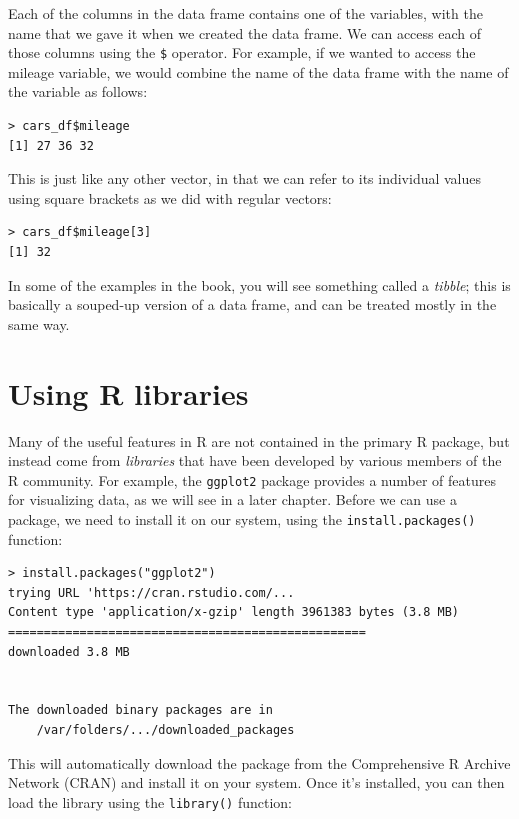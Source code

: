 \documentclass[12pt,]{book}
\begin{document}
Each of the columns in the data frame contains one of the variables, with the name that we gave it when we created the data frame. We can access each of those columns using the \texttt{\$} operator. For example, if we wanted to access the mileage variable, we would combine the name of the data frame with the name of the variable as follows:

\begin{verbatim}
> cars_df$mileage
[1] 27 36 32
\end{verbatim}

This is just like any other vector, in that we can refer to its individual values using square brackets as we did with regular vectors:

\begin{verbatim}
> cars_df$mileage[3]
[1] 32
\end{verbatim}

In some of the examples in the book, you will see something called a \emph{tibble}; this is basically a souped-up version of a data frame, and can be treated mostly in the same way.

\hypertarget{using-r-libraries}{%
\section{Using R libraries}\label{using-r-libraries}}

Many of the useful features in R are not contained in the primary R package, but instead come from \emph{libraries} that have been developed by various members of the R community. For example, the \texttt{ggplot2} package provides a number of features for visualizing data, as we will see in a later chapter. Before we can use a package, we need to install it on our system, using the \texttt{install.packages()} function:

\begin{verbatim}
> install.packages("ggplot2")
trying URL 'https://cran.rstudio.com/...
Content type 'application/x-gzip' length 3961383 bytes (3.8 MB)
==================================================
downloaded 3.8 MB


The downloaded binary packages are in
    /var/folders/.../downloaded_packages
\end{verbatim}

This will automatically download the package from the Comprehensive R Archive Network (CRAN) and install it on your system. Once it's installed, you can then load the library using the \texttt{library()} function:
\end{document}

